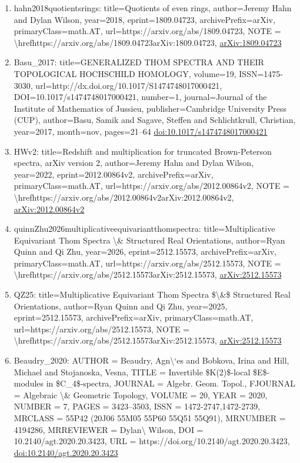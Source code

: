 \documentclass[11pt]{article}
\begin{document}
\begin{enumerate}[leftmargin=*]
  \item hahn2018quotientsrings: title=Quotients of even rings, author=Jeremy Hahn and Dylan Wilson, year=2018, eprint=1809.04723, archivePrefix=arXiv, primaryClass=math.AT, url=https://arxiv.org/abs/1809.04723, NOTE = \textbackslash{}hrefhttps://arxiv.org/abs/1809.04723arXiv:1809.04723, \href{https://arxiv.org/abs/1809.04723}{arXiv:1809.04723}
  \item Basu\_2017: title=GENERALIZED THOM SPECTRA AND THEIR TOPOLOGICAL HOCHSCHILD HOMOLOGY, volume=19, ISSN=1475-3030, url=http://dx.doi.org/10.1017/S1474748017000421, DOI=10.1017/s1474748017000421, number=1, journal=Journal of the Institute of Mathematics of Jussieu, publisher=Cambridge University Press (CUP), author=Basu, Samik and Sagave, Steffen and Schlichtkrull, Christian, year=2017, month=nov, pages=21--64 \href{https://doi.org/10.1017/s1474748017000421}{doi:10.1017/s1474748017000421}
  \item HWv2: title=Redshift and multiplication for truncated Brown-Peterson spectra, arXiv version 2, author=Jeremy Hahn and Dylan Wilson, year=2022, eprint=2012.00864v2, archivePrefix=arXiv, primaryClass=math.AT, url=https://arxiv.org/abs/2012.00864v2, NOTE = \textbackslash{}hrefhttps://arxiv.org/abs/2012.00864v2arXiv:2012.00864v2, \href{https://arxiv.org/abs/2012.00864v2}{arXiv:2012.00864v2}
  \item quinnZhu2026multiplicativeequivariantthomspectra: title=Multiplicative Equivariant Thom Spectra \textbackslash{}\& Structured Real Orientations, author=Ryan Quinn and Qi Zhu, year=2026, eprint=2512.15573, archivePrefix=arXiv, primaryClass=math.AT, url=https://arxiv.org/abs/2512.15573, NOTE = \textbackslash{}hrefhttps://arxiv.org/abs/2512.15573arXiv:2512.15573, \href{https://arxiv.org/abs/2512.15573}{arXiv:2512.15573}
  \item QZ25: title=Multiplicative Equivariant Thom Spectra \$\textbackslash{}\&\$ Structured Real Orientations, author=Ryan Quinn and Qi Zhu, year=2025, eprint=2512.15573, archivePrefix=arXiv, primaryClass=math.AT, url=https://arxiv.org/abs/2512.15573, NOTE = \textbackslash{}hrefhttps://arxiv.org/abs/2512.15573arXiv:2512.15573, \href{https://arxiv.org/abs/2512.15573}{arXiv:2512.15573}
  \item Beaudry\_2020: AUTHOR = Beaudry, Agn\textbackslash{}`es and Bobkova, Irina and Hill, Michael and Stojanoska, Vesna, TITLE = Invertible \$K(2)\$-local \$E\$-modules in \$C\_4\$-spectra, JOURNAL = Algebr. Geom. Topol., FJOURNAL = Algebraic \textbackslash{}\& Geometric Topology, VOLUME = 20, YEAR = 2020, NUMBER = 7, PAGES = 3423--3503, ISSN = 1472-2747,1472-2739, MRCLASS = 55P42 (20J06 55M05 55P60 55Q51 55Q91), MRNUMBER = 4194286, MRREVIEWER = Dylan\textbackslash{} Wilson, DOI = 10.2140/agt.2020.20.3423, URL = https://doi.org/10.2140/agt.2020.20.3423, \href{https://doi.org/10.2140/agt.2020.20.3423}{doi:10.2140/agt.2020.20.3423}

\end{enumerate}
\end{document}
